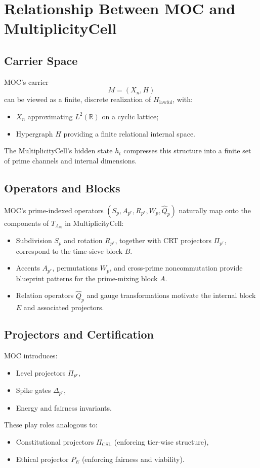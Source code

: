 \documentclass[11pt]{article}
\begin{document}
\section{Relationship Between MOC and MultiplicityCell}

\subsection{Carrier Space}

MOC's carrier
\[
  M = (X_n,H)
\]
can be viewed as a finite, discrete realization of
\(H_{\text{lawful}}\), with:
\begin{itemize}[leftmargin=1.5em]
  \item \(X_n\) approximating \(L^2(\mathbb{R})\) on a cyclic lattice;
  \item Hypergraph \(H\) providing a finite relational internal space.
\end{itemize}
The MultiplicityCell's hidden state \(h_t\) compresses this structure into a
finite set of prime channels and internal dimensions.

\subsection{Operators and Blocks}

MOC's prime-indexed operators \((S_p, A_{p^r}, R_{p^r}, W_p, \hat Q_p)\)
naturally map onto the components of \(T_{\Lambda_m}\) in MultiplicityCell:
\begin{itemize}[leftmargin=1.5em]
  \item Subdivision \(S_p\) and rotation \(R_{p^r}\), together with CRT
  projectors \(\Pi_{p^r}\), correspond to the time-sieve block \(B\).
  \item Accents \(A_{p^r}\), permutations \(W_p\), and cross-prime
  noncommutation provide blueprint patterns for the prime-mixing block \(A\).
  \item Relation operators \(\hat Q_p\) and gauge transformations motivate the
  internal block \(E\) and associated projectors.
\end{itemize}

\subsection{Projectors and Certification}

MOC introduces:
\begin{itemize}[leftmargin=1.5em]
  \item Level projectors \(\Pi_{p^r}\),
  \item Spike gates \(\Delta_{p^r}\),
  \item Energy and fairness invariants.
\end{itemize}
These play roles analogous to:
\begin{itemize}[leftmargin=1.5em]
  \item Constitutional projectors \(\Pi_{\text{CSL}}\) (enforcing tier-wise
  structure),
  \item Ethical projector \(P_E\) (enforcing fairness and viability).
\end{itemize}
\end{document}
